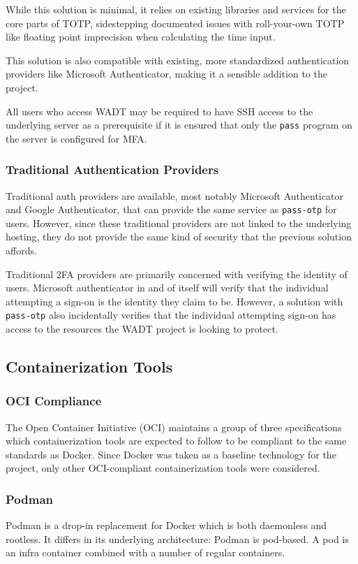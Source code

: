 \documentclass[12pt]{article}
\begin{document}
While this solution is minimal, it relies on existing libraries and services for the core parts of TOTP, sidestepping documented issues with roll-your-own TOTP like floating point imprecision when calculating the time input.

This solution is also compatible with existing, more standardized authentication providers like Microsoft Authenticator, making it a sensible addition to the project.

All users who access WADT may be required to have SSH access to the underlying server as a prerequisite if it is ensured that only the \texttt{pass} program on the server is configured for MFA.


\subsubsection{Traditional Authentication Providers}
Traditional auth providers are available, most notably Microsoft Authenticator and Google Authenticator, that can provide the same service as \texttt{pass-otp} for users. However, since these traditional providers are not linked to the underlying hosting, they do not provide the same kind of security that the previous solution affords.

Traditional 2FA providers are primarily concerned with verifying the identity of users. Microsoft authenticator in and of itself will verify that the individual attempting a sign-on is the identity they claim to be. However, a solution with \texttt{pass-otp} also incidentally verifies that the individual attempting sign-on has access to the resources the WADT project is looking to protect.

\subsection{Containerization Tools}
\subsubsection{OCI Compliance}
The Open Container Initiative (OCI) maintains a group of three specifications which containerization tools are expected to follow to be compliant to the same standards as Docker. Since Docker was taken as a baseline technology for the project, only other OCI-compliant containerization tools were considered.

\subsubsection{Podman}
Podman is a drop-in replacement for Docker which is both daemonless and rootless. It differs in its underlying architecture: Podman is pod-based. A pod is an infra container combined with a number of regular containers.
\end{document}
